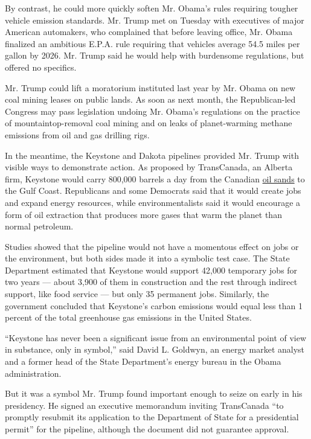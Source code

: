 By contrast, he could more quickly soften Mr. Obama's rules requiring
tougher vehicle emission standards. Mr. Trump met on Tuesday with
executives of major American automakers, who complained that before
leaving office, Mr. Obama finalized an ambitious E.P.A. rule requiring
that vehicles average 54.5 miles per gallon by 2026. Mr. Trump said he
would help with burdensome regulations, but offered no specifics.

Mr. Trump could lift a moratorium instituted last year by Mr. Obama on
new coal mining leases on public lands. As soon as next month, the
Republican-led Congress may pass legislation undoing Mr. Obama's
regulations on the practice of mountaintop-removal coal mining and on
leaks of planet-warming methane emissions from oil and gas drilling
rigs.

In the meantime, the Keystone and Dakota pipelines provided Mr. Trump
with visible ways to demonstrate action. As proposed by TransCanada, an
Alberta firm, Keystone would carry 800,000 barrels a day from the
Canadian
\href{https://www.nytimes.com/topic/subject/oil-sands?inline=nyt-classifier}{oil
sands} to the Gulf Coast. Republicans and some Democrats said that it
would create jobs and expand energy resources, while environmentalists
said it would encourage a form of oil extraction that produces more
gases that warm the planet than normal petroleum.

Studies showed that the pipeline would not have a momentous effect on
jobs or the environment, but both sides made it into a symbolic test
case. The State Department estimated that Keystone would support 42,000
temporary jobs for two years --- about 3,900 of them in construction and
the rest through indirect support, like food service --- but only 35
permanent jobs. Similarly, the government concluded that Keystone's
carbon emissions would equal less than 1 percent of the total greenhouse
gas emissions in the United States.

``Keystone has never been a significant issue from an environmental
point of view in substance, only in symbol,'' said David L. Goldwyn, an
energy market analyst and a former head of the State Department's energy
bureau in the Obama administration.

But it was a symbol Mr. Trump found important enough to seize on early
in his presidency. He signed an executive memorandum inviting
TransCanada ``to promptly resubmit its application to the Department of
State for a presidential permit'' for the pipeline, although the
document did not guarantee approval.

